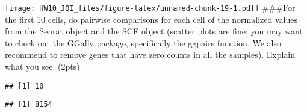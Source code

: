 \documentclass[]{article}
\newenvironment{Shaded}{\begin{snugshade}}{\end{snugshade}}
\newcommand{\KeywordTok}[1]{\textcolor[rgb]{0.13,0.29,0.53}{\textbf{#1}}}
\newcommand{\DecValTok}[1]{\textcolor[rgb]{0.00,0.00,0.81}{#1}}
\newcommand{\StringTok}[1]{\textcolor[rgb]{0.31,0.60,0.02}{#1}}
\newcommand{\CommentTok}[1]{\textcolor[rgb]{0.56,0.35,0.01}{\textit{#1}}}
\newcommand{\OperatorTok}[1]{\textcolor[rgb]{0.81,0.36,0.00}{\textbf{#1}}}
\newcommand{\NormalTok}[1]{#1}
\begin{document}
\texttt{[image: HW10\_JQI\_files/figure-latex/unnamed-chunk-19-1.pdf]}
\#\#\#For the first 10 cells, do pairwise comparisons for each cell of
the normalized values from the Seurat object and the SCE object (scatter
plots are fine; you may want to check out the GGally package,
specifically the ggpairs function. We also recommend to remove genes
that have zero counts in all the samples). Explain what you see. (2pts)

\begin{Shaded}
\end{Shaded}

\begin{verbatim}
## [1] 10
\end{verbatim}

\begin{Shaded}
\end{Shaded}

\begin{verbatim}
## [1] 8154
\end{verbatim}
\end{document}
